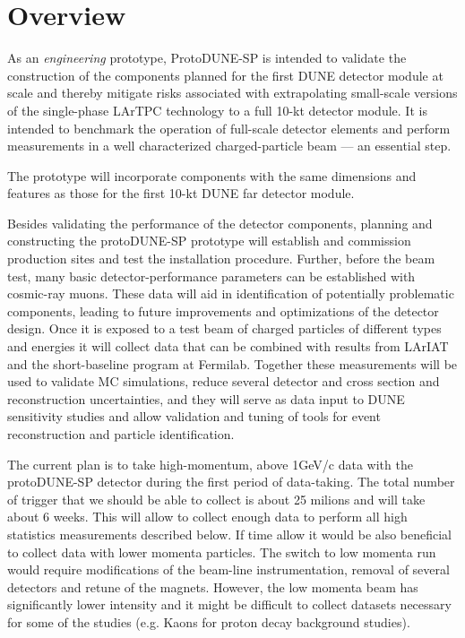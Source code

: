 
\section{Overview}

As an \textit{engineering} prototype, ProtoDUNE-SP is
intended to validate the construction of the components planned for the
first DUNE  detector module at scale and thereby mitigate
risks associated with extrapolating small-scale versions of the
single-phase LArTPC technology to a full 10-kt detector module.  It is
intended to benchmark the operation of full-scale detector
elements and perform measurements in a well characterized
charged-particle beam --- an essential step.

The prototype will incorporate components with the same
dimensions and features as those for the first 10-kt DUNE far detector
module.

Besides validating the performance of the detector components,
planning and constructing the protoDUNE-SP prototype will establish and
commission production sites and test the installation procedure.
Further, before the beam test, many basic detector-performance
parameters can be established with cosmic-ray muons.  These data will
aid in identification of potentially problematic components, leading
to future improvements and optimizations of the detector design.  Once
it is exposed to a test beam of charged particles of different types
and energies it will collect data that can be combined with results
from LArIAT and the short-baseline program at Fermilab.  Together
these measurements will be used to validate MC simulations, reduce several detector and cross section and reconstruction uncertainties, and they
will serve as data input to DUNE sensitivity studies and allow
validation and tuning of tools for event reconstruction and particle
identification.

The current plan is to take high-momentum, above 1GeV/c  data with the protoDUNE-SP detector during the first  period of data-taking. The total number of trigger that we should be able to collect is about 25 milions and will take about 6 weeks. This will allow to collect enough data to perform all high statistics measurements described below.  If time allow it would be also beneficial to collect data with lower momenta particles. The switch to low momenta run would require modifications of the beam-line instrumentation, removal of several detectors and retune of the magnets. However, the low momenta beam has significantly lower intensity and it might be difficult to collect datasets necessary for some of the studies (e.g. Kaons for proton decay background studies).


